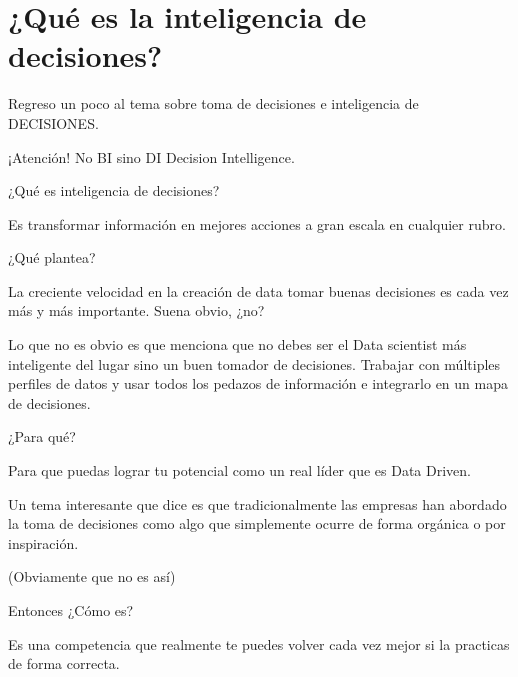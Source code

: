 \chapter{¿Qué es la inteligencia de decisiones?}
\label{Cap1}

Regreso un poco al tema sobre toma de decisiones e inteligencia de DECISIONES. 


¡Atención! No BI sino DI Decision Intelligence. 


¿Qué es inteligencia de decisiones? 


Es transformar información en mejores acciones a gran escala en cualquier rubro. 


¿Qué plantea? 


La creciente velocidad en la creación de data tomar buenas decisiones es cada vez más y más importante. Suena obvio, ¿no? 


Lo que no es obvio es que menciona que no debes ser el Data scientist más inteligente del lugar sino un buen tomador de decisiones. Trabajar con múltiples perfiles de datos y usar todos los pedazos de información e integrarlo en un mapa de decisiones. 


¿Para qué?


Para que puedas lograr tu potencial como un real líder que es Data Driven. 


Un tema interesante que dice es que tradicionalmente las empresas han abordado la toma de decisiones como algo que simplemente ocurre de forma orgánica o por inspiración. 


(Obviamente que no es así)


Entonces ¿Cómo es?


Es una competencia que realmente te puedes volver cada vez mejor si la practicas de forma correcta. 



